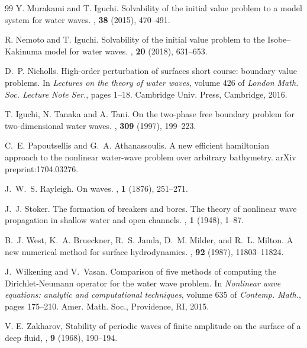 \documentclass[11pt,leqno]{article}
\numberwithin{equation}{section}
\numberwithin{figure}{section}
\begin{document}
\begin{thebibliography}{99}
Y. Murakami and T. Iguchi. 
\newblock Solvability of the initial value problem to a model system for water waves. 
, {\bf 38} (2015), 470--491.

R. Nemoto and T. Iguchi. 
\newblock Solvability of the initial value problem to the Isobe--Kakinuma model for water waves. 
, {\bf 20} (2018), 631--653. 

D.~P. Nicholls.
\newblock High-order perturbation of surfaces short course: boundary value problems.
\newblock In {\em Lectures on the theory of water waves}, volume 426 of {\em
	London Math. Soc. Lecture Note Ser.}, pages 1--18. Cambridge Univ. Press,
Cambridge, 2016.

T. Iguchi, N. Tanaka and A. Tani. 
\newblock On the two-phase free boundary problem for two-dimensional water waves. 
, {\bf 309} (1997), 199--223. 

C.~E. Papoutsellis and G.~A. Athanassoulis.
\newblock A new efficient hamiltonian approach to the nonlinear water-wave
problem over arbitrary bathymetry.
\newblock arXiv preprint:1704.03276.

J.~W.~S. Rayleigh.
\newblock On waves.
, {\bf 1} (1876), 251--271.

J.~J. Stoker.
\newblock The formation of breakers and bores. {T}he theory of nonlinear wave
propagation in shallow water and open channels.
, {\bf 1} (1948), 1--87.

B.~J. West, K.~A. Brueckner, R.~S. Janda, D.~M. Milder, and R.~L. Milton.
\newblock A new numerical method for surface hydrodynamics.
, {\bf 92} (1987), 11803--11824.

J.~Wilkening and V.~Vasan.
\newblock Comparison of five methods of computing the {D}irichlet-{N}eumann
operator for the water wave problem.
\newblock In {\em Nonlinear wave equations: analytic and computational
	techniques}, volume 635 of {\em Contemp. Math.}, pages 175--210. Amer. Math.
Soc., Providence, RI, 2015.

V. E. Zakharov,
\newblock Stability of periodic waves of finite amplitude on the surface of a deep fluid, 
, {\bf 9} (1968), 190--194. 
%
\end{thebibliography}
\end{document}
